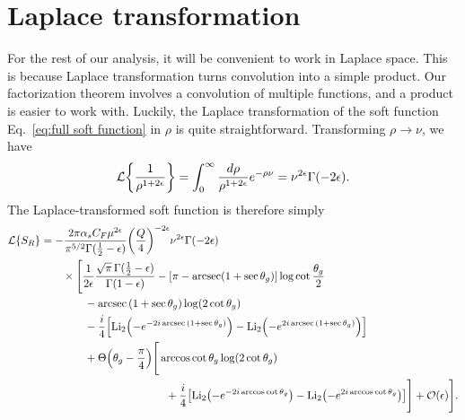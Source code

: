 \documentclass[11pt,twoside,reqno]{amsart}
\theoremstyle{plain}
\theoremstyle{remark}
\theoremstyle{definition}
\theoremstyle{remark}
\theoremstyle{definition}
\theoremstyle{definition}
\newcommand{\cL}{\mathcal{L}}
\newcommand{\cO}{\mathcal{O}}
\newcommand{\Li}{\mathrm{Li}}
\begin{document}
\section{Laplace transformation}
	For the rest of our analysis, it will be convenient to work in Laplace space. This is because Laplace transformation turns convolution into a simple product. Our factorization theorem involves a convolution of multiple functions, and a product is easier to work with. Luckily, the Laplace transformation of the soft function Eq.~\ref{eq:full soft function} in $\rho$ is quite straightforward. Transforming $\rho \to \nu$, we have
	\begin{equation}
		\cL\qty{\frac{1}{\rho^{1+2\epsilon}}} = \int_0^\infty \frac{d\rho}{\rho^{1+2\epsilon}} e^{-\rho\nu} = \nu^{2\epsilon} \Gamma(-2\epsilon).
	\end{equation}
	The Laplace-transformed soft function is therefore simply
	\begin{equation}
	\begin{aligned}
		\cL\qty{S_R} &= -\frac{2\pi\alpha_s C_F\mu^{2\epsilon}}{\pi^{5/2} \Gamma(\frac{1}{2} - \epsilon)}\qty(\frac{Q}{4})^{-2\epsilon} \nu^{2\epsilon} \Gamma(-2\epsilon) \\
			&\qquad\times \Bigg[\frac{1}{2\epsilon}\frac{\sqrt{\pi} \, \Gamma(\frac{1}{2} - \epsilon)}{\Gamma(1 - \epsilon)} - \qty[\pi - \arcsec(1 + \sec\theta_g)]\log\cot\frac{\theta_g}{2} \\
			&\qquad\qquad - \arcsec\qty(1 + \sec\theta_g) \log(2\cot\theta_g) \\
			&\qquad\qquad - \frac{i}{4}\qty[\Li_2\qty(-e^{-2i\arcsec\qty(1 + \sec\theta_g)}) - \Li_2\qty(-e^{2i\arcsec\qty(1 + \sec\theta_g)})] \\
			&\qquad\qquad+ \Theta\qty(\theta_g - \frac{\pi}{4})\Bigg[ \arccos\cot\theta_g \log(2\cot\theta_g) \\
			&\hspace{4cm}+ \frac{i}{4}\qty[\Li_2\qty(-e^{-2i\arccos\cot\theta_g}) - \Li_2\qty(-e^{2i\arccos\cot\theta_g})] \Bigg] + \cO(\epsilon) \Bigg].
	\end{aligned}
	\end{equation}
\end{document}
